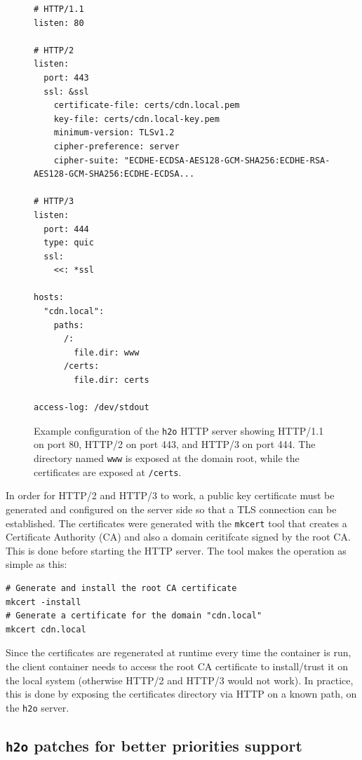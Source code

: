 \begin{figure}[h]
    \centering
    \begin{verbatim}
# HTTP/1.1
listen: 80

# HTTP/2
listen:
  port: 443
  ssl: &ssl
    certificate-file: certs/cdn.local.pem
    key-file: certs/cdn.local-key.pem
    minimum-version: TLSv1.2
    cipher-preference: server
    cipher-suite: "ECDHE-ECDSA-AES128-GCM-SHA256:ECDHE-RSA-AES128-GCM-SHA256:ECDHE-ECDSA...

# HTTP/3
listen:
  port: 444
  type: quic
  ssl:
    <<: *ssl

hosts:
  "cdn.local":
    paths:
      /:
        file.dir: www
      /certs:
        file.dir: certs

access-log: /dev/stdout
    \end{verbatim}
    \caption{Example configuration of the \texttt{h2o} HTTP server showing HTTP/1.1 on port 80, HTTP/2 on port 443, and HTTP/3 on port 444. The directory named \texttt{www} is exposed at the domain root, while the certificates are exposed at \texttt{/certs}.}
    \label{fig:h2o}
\end{figure}

In order for HTTP/2 and HTTP/3 to work, a public key certificate must be generated and configured on the server side so that a TLS connection can be established. The certificates were generated with the \texttt{mkcert} tool that creates a Certificate Authority (CA) and also a domain ceritifcate signed by the root CA. This is done before starting the HTTP server. The tool makes the operation as simple as this:

\begin{verbatim}
# Generate and install the root CA certificate
mkcert -install
# Generate a certificate for the domain "cdn.local"
mkcert cdn.local
\end{verbatim}

Since the certificates are regenerated at runtime every time the container is run, the client container needs to access the root CA certificate to install/trust it on the local system (otherwise HTTP/2 and HTTP/3 would not work). In practice, this is done by exposing the certificates directory via HTTP on a known path, on the \texttt{h2o} server.

\subsection{\texttt{h2o} patches for better priorities support}
\label{sec:testbed/cdn/h2o}

